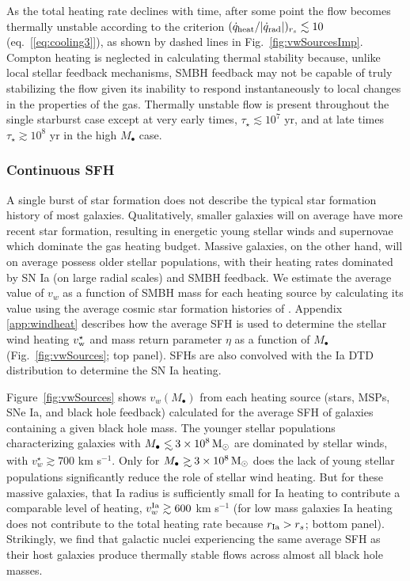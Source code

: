 \documentclass[usenatbib,fleqn]{mn2e}
\newcommand\lsim{\mathrel{\rlap{\lower4pt\hbox{\hskip1pt$\sim$}}
    \raise1pt\hbox{$<$}}}
\newcommand\gsim{\mathrel{\rlap{\lower4pt\hbox{\hskip1pt$\sim$}}
    \raise1pt\hbox{$>$}}}
\newcommand{\rs}{r_s}
\newcommand{\Mbh}[1][]{M_{\bullet#1}}
\newcommand{\vwO}{v_{w}}
\begin{document}
As the total heating rate declines with time, after some point the
flow becomes thermally unstable according to the criterion
$(\dot{q}_{\rm heat}/|\dot{q}_{\rm rad}|)_{r_{s}} \lesssim 10$
(eq.~[\ref{eq:cooling3}]), as shown by dashed lines in
Fig.~\ref{fig:vwSourcesImp}.  Compton heating is neglected in
calculating thermal stability because, unlike local stellar feedback
mechanisms, SMBH feedback may not be capable of truly stabilizing the
flow given its inability to respond instantaneously to local changes
in the properties of the gas.  Thermally unstable flow is present
throughout the single starburst case except at very early times,
$\tau_{\star} \lesssim 10^7$ yr, and at late times $\tau_{\star}
\gtrsim 10^{8}$ yr in the high $M_{\bullet}$ case.

\subsubsection{Continuous SFH}
A single burst of star formation does not describe the typical star
formation history of most galaxies.  Qualitatively, smaller galaxies
will on average have more recent star formation, resulting in
energetic young stellar winds and supernovae which dominate the gas
heating budget.  Massive galaxies, on the other hand, will on average
possess older stellar populations, with their heating rates dominated
by SN Ia (on large radial scales) and SMBH feedback.  We estimate the
average value of $\vwO$ as a function of SMBH mass for each heating
source by calculating its value using the average cosmic star
formation histories of \citet{MosterNaab+:2013a}.  Appendix
\ref{app:windheat} describes how the average SFH is
used to determine the stellar wind heating $v_{\rm w}^{\star}$ and
mass return parameter $\eta$ as a function of $M_{\bullet}$
(Fig.~\ref{fig:vwSources}; top panel).  SFHs are also
convolved with the Ia DTD distribution to determine the SN Ia heating.

Figure~\ref{fig:vwSources} shows $\vwO(M_{\bullet})$ from each heating
source (stars, MSPs, SNe Ia, and black hole feedback) calculated for
the average SFH of galaxies containing a given
black hole mass.  The younger stellar populations characterizing galaxies
with $\Mbh\lsim 3\times 10^{8} \Msun$ are dominated by stellar winds, with $v_{w}^{\star} \gtrsim 700$ km s$^{-1}$.  Only for $\Mbh\gsim 3\times 10^{8} \Msun$ does the lack
of young stellar populations significantly reduce the role of stellar
wind heating.  But for these massive galaxies, that Ia radius is sufficiently small for Ia heating to contribute a comparable level of heating, $v_{w}^{\rm Ia} \gtrsim 600$ km s$^{-1}$ (for low mass galaxies Ia heating does not contribute to the total heating rate because $r_{\rm Ia} > \rs$; bottom panel).  Strikingly, we find that galactic nuclei experiencing the same
  average SFH as their host galaxies produce thermally stable flows across almost all black hole masses.  
\end{document}
